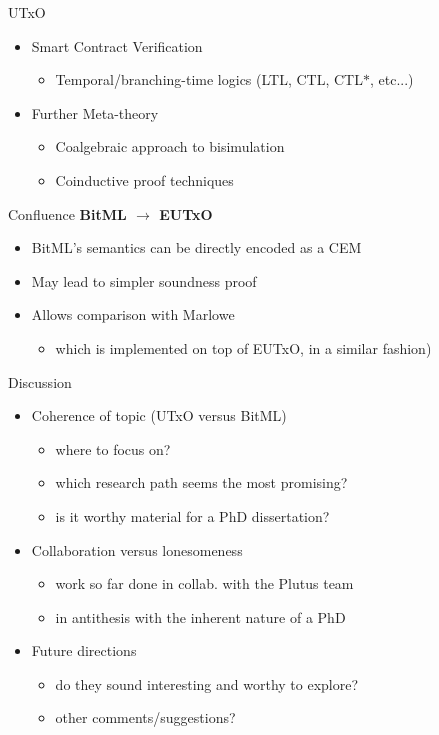 \documentclass[aspectratio=43]{beamer}
\renewcommand\alert[1]{\textcolor{mLightBrown}{#1}}
\begin{document}
\begin{frame}{UTxO}
\begin{itemize}
\item Smart Contract Verification
\begin{itemize}
\item Temporal/branching-time logics (LTL, CTL, CTL$*$, etc...)
\end{itemize}

\item Further Meta-theory
\begin{itemize}
\item Coalgebraic approach to bisimulation
\item Coinductive proof techniques
\end{itemize}

\end{itemize}
\end{frame}

\begin{frame}{Confluence}
\centering \textbf{BitML $\to$ EUTxO}
\vspace{1cm}
\begin{itemize}
\item BitML's semantics can be directly encoded as a CEM
\item May lead to simpler soundness proof
\item Allows comparison with Marlowe
  \begin{itemize}
  \item which is implemented on top of EUTxO, in a similar fashion)
  \end{itemize}
\end{itemize}
\end{frame}

\begin{frame}{Discussion}
\begin{itemize}
\item Coherence of topic (UTxO \alert{versus} BitML)
  \begin{itemize}
  \item where to focus on?
  \item which research path seems the most promising?
  \item is it worthy material for a PhD dissertation?
  \end{itemize}
\pause
\item Collaboration \alert{versus} lonesomeness
  \begin{itemize}
  \item work so far done in collab. with the Plutus team
  \item in antithesis with the inherent nature of a PhD
  \end{itemize}
\pause
\item \alert{Future} directions
  \begin{itemize}
  \item do they sound interesting and worthy to explore?
  \item other comments/suggestions?
  \end{itemize}
\end{itemize}
\end{frame}

\end{document}
